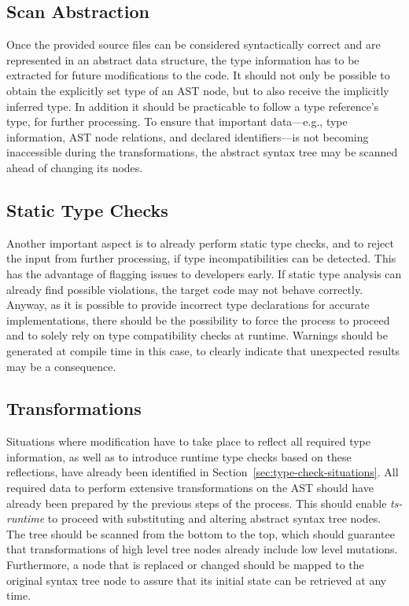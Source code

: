 \subsection{Scan Abstraction}

Once the provided source files can be considered syntactically correct and are represented in an abstract data structure, the type information has to be extracted for future modifications to the code. It should not only be possible to obtain the explicitly set type of an AST node, but to also receive the implicitly inferred type. In addition it should be practicable to follow a type reference's type, for further processing. To ensure that important data---e.g., type information, AST node relations, and declared identifiers---is not becoming inaccessible during the transformations, the abstract syntax tree may be scanned ahead of changing its nodes.

\subsection{Static Type Checks}

Another important aspect is to already perform static type checks, and to reject the input from further processing, if type incompatibilities can be detected. This has the advantage of flagging issues to developers early. If static type analysis can already find possible violations, the target code may not behave correctly. Anyway, as it is possible to provide incorrect type declarations for accurate implementations, there should be the possibility to force the process to proceed and to solely rely on type compatibility checks at runtime. Warnings should be generated at compile time in this case, to clearly indicate that unexpected results may be a consequence.

\subsection{Transformations}

Situations where modification have to take place to reflect all required type information, as well as to introduce runtime type checks based on these reflections, have already been identified in Section~\ref{sec:type-check-situations}. All required data to perform extensive transformations on the AST should have already been prepared by the previous steps of the process. This should enable \emph{ts-runtime} to proceed with substituting and altering abstract syntax tree nodes. The tree should be scanned from the bottom to the top, which should guarantee that transformations of high level tree nodes already include low level mutations. Furthermore, a node that is replaced or changed should be mapped to the original syntax tree node to assure that its initial state can be retrieved at any time.

